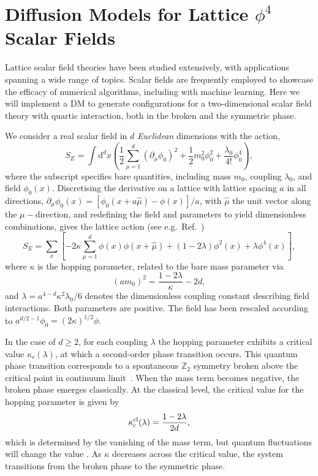 
\section{Diffusion Models for Lattice $\phi^4$ Scalar Fields}
\label{sec:phi4}

Lattice scalar field theories have been studied extensively, with applications spanning a wide range of topics. Scalar fields are frequently employed to showcase the efficacy of numerical algorithms, including with machine learning. Here we will implement a DM to generate configurations for a two-dimensional scalar field theory with quartic interaction, both in the broken and the symmetric phase. 

We consider a real scalar field in $d$ \textit{Euclidean} dimensions with the action, 
\begin{equation}
S_E = \int \text{d}^{d}x\left( \frac{1}{2}\sum_{\mu=1}^d\left(\partial_\mu\phi_0\right)^2 + \frac{1}{2} m_0^2\phi_0^2 + \frac{\lambda_0}{4!}\phi_0^4 \right),
\end{equation}
where the subscript specifies bare quantities, including mass $m_0$, coupling $\lambda_0$, and field $\phi_0(x)$. Discretising the derivative on a lattice with lattice spacing $a$ in all directions,   $\partial_\mu\phi_0(x)=[\phi_0(x+a\hat\mu)-\phi(x)]/a$, with $\hat{\mu}$ the unit vector along the $\mu-$direction, and redefining the field and parameters to yield dimensionless combinations, gives the lattice action (see e.g.\ Ref.~\cite{Smit:2002ug})
\begin{equation}
S_E = \sum_x \left[  -2\kappa \sum_{\mu = 1}^d\phi(x)\phi(x+\hat{\mu}) + (1-2\lambda)\phi^2(x) + \lambda\phi^4(x) \right],
\label{eq:phi4action}
\end{equation}
where $\kappa$ is the hopping parameter, related to the bare mass parameter via
\begin{equation}
     (am_0)^2 = \frac{1-2\lambda}{\kappa} - 2d,
\end{equation}
and $\lambda=a^{4-d}\kappa^2\lambda_0/6$ denotes the dimensionless coupling constant describing field interactions. Both parameters are positive. The field has been rescaled according to $a^{d/2-1}\phi_0=(2\kappa)^{1/2}\phi$.

In the case of $d\geq2$, for each coupling $\lambda$ the hopping parameter exhibits a critical value $\kappa_c(\lambda)$, at which a second-order phase transition occurs. This quantum phase transition corresponds to a spontaneous $\mathbb{Z}_2$ symmetry broken above the critical point in continuum limit~\cite{Akiyama:2021zhf}. When the mass term becomes negative, the broken phase emerges classically.  At the classical level, the critical value for the hopping parameter is given by
\begin{equation}
    \kappa_\text{c}^{\rm cl}(\lambda) = \frac{1-2\lambda}{2d},\label{eq:kc}
\end{equation}
which is determined by the vanishing of the mass term,  but quantum fluctuations will change the value \cite{Smit:2002ug}. As $\kappa$ decreases across the critical value, the system transitions from the broken phase to the symmetric phase.


